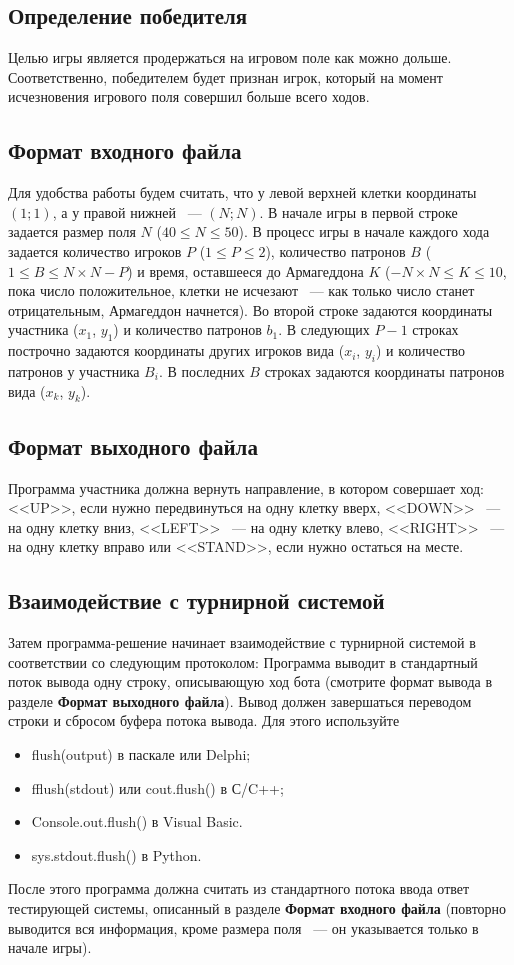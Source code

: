 \documentclass[a4paper,12pt]{article}
\begin{document}
\subsection{Определение победителя}
Целью игры является продержаться на игровом поле как можно дольше. Соответственно, победителем будет признан игрок, который на момент исчезновения игрового поля совершил больше всего ходов.

\subsection{Формат входного файла}
Для удобства работы будем считать, что у левой верхней клетки координаты $(1;1)$, а у правой нижней ~--- $(N;N)$. В начале игры в первой строке задается размер поля $N$ ($40 \leq N \leq 50$).
В процесс игры в начале каждого хода задается количество игроков $P$ ($1 \leq P \leq 2$), количество патронов $B$ ($1 \leq B \leq N\times N - P$) и время, оставшееся до Армагеддона $K$ ($-N\times N \leq K \leq 10$, пока число положительное, клетки не исчезают ~--- как только число станет отрицательным, Армагеддон начнется).
Во второй строке задаются координаты участника ($x_1$, $y_1$) и количество патронов $b_1$.
В следующих $P-1$ строках построчно задаются координаты других игроков вида ($x_i$, $y_i$) и количество патронов у участника $B_i$.
В последних $B$ строках задаются координаты патронов вида ($x_k$, $y_k$).

\subsection{Формат выходного файла}
Программа участника должна вернуть направление, в котором совершает ход: <<UP>>, если нужно передвинуться на одну клетку вверх, <<DOWN>> ~--- на одну клетку вниз, <<LEFT>> ~--- на одну клетку влево, <<RIGHT>> ~--- на одну клетку вправо или <<STAND>>, если нужно остаться на месте.

\subsection{Взаимодействие с турнирной системой}
Затем программа-решение начинает взаимодействие с турнирной системой в соответствии со следующим протоколом:
Программа выводит в стандартный поток вывода одну строку, описывающую ход бота (смотрите формат вывода в разделе \textbf{Формат выходного файла}). Вывод должен завершаться переводом строки и сбросом буфера потока
вывода. Для этого используйте
\begin{itemize}
\item flush(output) в паскале или Delphi;
\item fflush(stdout) или cout.flush() в С/C++;
\item Console.out.flush() в Visual Basic.
\item sys.stdout.flush() в Python.
\end{itemize}
После этого программа должна считать из стандартного потока ввода ответ тестирующей системы, описанный в разделе \textbf{Формат входного файла} (повторно выводится вся информация, кроме размера поля ~--- он указывается только в начале игры).
\end{document}
